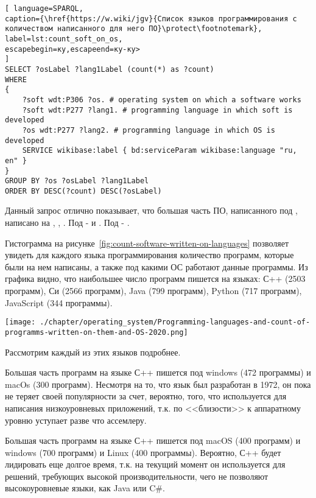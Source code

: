 \begin{lstlisting}[ language=SPARQL, 
caption={\href{https://w.wiki/jgv}{Список языков программирования с количеством написанного для него ПО}\protect\footnotemark},
label=lst:count_soft_on_os, 
escapebegin=ку,escapeend=ку-ку>
]
SELECT ?osLabel ?lang1Label (count(*) as ?count)
WHERE
{
	?soft wdt:P306 ?os. # operating system on which a software works
	?soft wdt:P277 ?lang1. # programming language in which soft is developed
	?os wdt:P277 ?lang2. # programming language in which OS is developed
	SERVICE wikibase:label { bd:serviceParam wikibase:language "ru, en" }
}
GROUP BY ?os ?osLabel ?lang1Label
ORDER BY DESC(?count) DESC(?osLabel)
\end{lstlisting}

 Данный запрос отлично показывает, что большая часть ПО, написанного под , написано на , , . Под  -  и . Под  - .


Гистограмма на рисунке~\ref{fig:count-software-written-on-languages} позволяет увидеть для каждого языка программирования количество программ, которые были на нем написаны, а также под какими ОС работают данные программы. Из графика видно, что наибольшее число программ пишется на языках: С++ (2503 программ), Си (2566 программ), Java (799 программ), Python (717 программ),  JavaScript (344 программы).


\begin{figure*}[h!]
	\texttt{[image: ./chapter/operating\_system/Programming-languages-and-count-of-programms-written-on-them-and-OS-2020.png]}
	\caption{Языки программирования и количества ОС, под которыми работают программы, написанные на них 2020 год.}
	\label{fig:count-software-written-on-languages}
\end{figure*}

Рассмотрим каждый из этих языков подробнее.

Большая часть программ на языке С++ пишется под windows (472 программы) и macOs (300 программ). Несмотря на то, что язык был разработан в 1972, он пока не теряет своей популярности за счет, вероятно, того, что используется для написания низкоуровневых приложений, т.к. по <<близости>> к аппаратному уровню уступает разве что ассемлеру.

Большая часть программ на языке С++ пишется под macOS (400 программ) и windows (700 программ) и Linux (400 программы). Вероятно, С++ будет лидировать еще долгое время, т.к. на текущий момент он используется для решений, требующих высокой производительности, чего не позволяют высокоуровневые языки, как Java или C\#.

